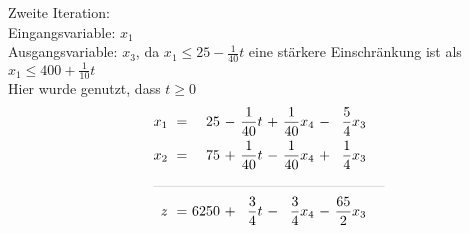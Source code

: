 \documentclass [a4paper,11pt]{article}
\begin{document}
\begin{enumerate}
\begin{enumerate}
                Zweite Iteration:\\
                Eingangsvariable: $x_1$\\
                Ausgangsvariable: $x_3$, da $x_1 \leq 25 - \frac{1}{40}t$ eine stärkere Einschränkung ist als $x_1 \leq 400 + \frac{1}{10}t$\\
                Hier wurde genutzt, dass $t \geq 0$
                \begin{align*}
                \begin{alignedat}{6}
                && x_1 &\ = &\   25 &\ - &\ \frac{1}{40}t &\ + &\ \frac{1}{40}x_4 &\ - &\ \frac{5}{4}x_3 \\
                && x_2 &\ = &\   75 &\ + &\ \frac{1}{40}t &\ - &\ \frac{1}{40}x_4 &\ + &\ \frac{1}{4}x_3 \\
                &\rlap{\rule{5.8cm}{.1pt}} &&&&&&&&&\\
                && z   &\ = &\ 6250 &\ + &\ \frac{3}{4}t &\ - &\  \frac{3}{4}x_4 &\ - &\ \frac{65}{2}x_3
                \end{alignedat}
                \end{align*}

            \end{enumerate}

    \end{enumerate}
\end{document}
